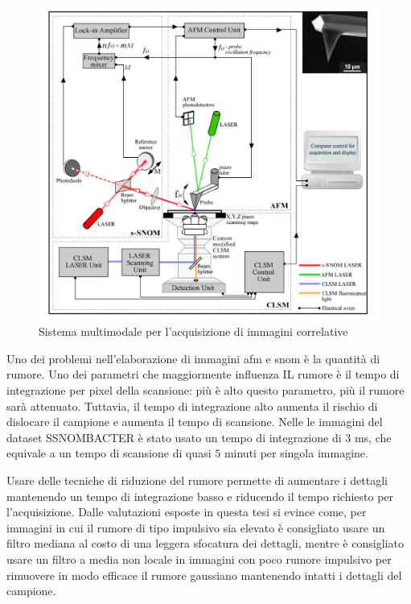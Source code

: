 \documentclass[../main.tex]{subfiles}
\begin{document}
\begin{figure}[h]
	\centering
	\includegraphics[keepaspectratio, height=\linewidth]{images/multimodal_system.jpg}
	\caption[Sistema multimodale per l'acquisizione di immagini correlative]{
		Sistema multimodale per l'acquisizione di immagini correlative \cite{stanciu_2017}}
	\label{fig:multimodal_system}
\end{figure}


Uno dei problemi nell'elaborazione di immagini \acrshort{afm} e \acrshort{snom} è la quantità di rumore. Uno dei parametri che maggiormente influenza IL rumore è il tempo di integrazione per pixel della scansione: più è alto questo parametro, più il rumore sarà attenuato. Tuttavia, il tempo di integrazione alto aumenta il rischio di dislocare il campione e aumenta il tempo di scansione. Nelle le immagini del dataset  SSNOMBACTER è stato usato un tempo di integrazione di $3$ ms, che equivale a un tempo di scansione di quasi $5$ minuti per singola immagine.

Usare delle tecniche di riduzione del rumore permette di aumentare i dettagli mantenendo un tempo di integrazione basso e riducendo il tempo richiesto per l'acquisizione. Dalle valutazioni esposte in questa tesi si evince come, per immagini in cui il rumore di tipo impulsivo sia elevato è consigliato usare un filtro mediana al costo di una leggera sfocatura dei dettagli, mentre è consigliato usare un filtro a media non locale in immagini con poco rumore impulsivo per rimuovere in modo efficace il rumore gaussiano mantenendo intatti i dettagli del campione.
\end{document}
